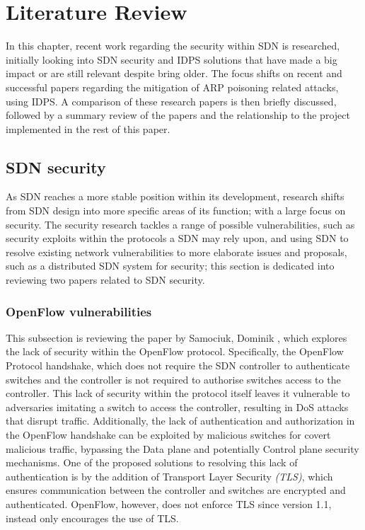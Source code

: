 \documentclass[12pt, oneside]{book}
\begin{document}
\chapter{Literature Review}
In this chapter, recent work regarding the security within SDN is researched,
initially looking into SDN security and IDPS solutions that have made a big impact or are still relevant despite bring older.
The focus shifts on recent and successful papers regarding the mitigation of ARP poisoning related attacks, using IDPS.
A comparison of these research papers is then briefly discussed, followed by a summary review of the papers and
the relationship to the project implemented in the rest of this paper.

\section{SDN security}
\label{sec:SDNSEC}
As SDN reaches a more stable position within its development,
research shifts from SDN design into more specific areas of its function; with a large focus on security.
The security research tackles a range of possible vulnerabilities, such as security exploits within the protocols a SDN may rely upon,
and using SDN to resolve existing network vulnerabilities to more elaborate issues and proposals, such as a distributed SDN system for
security; this section is dedicated into reviewing two papers related to SDN security.

\subsection{OpenFlow vulnerabilities}
This subsection is reviewing the paper by Samociuk, Dominik \cite{samociuk2015secure},
which explores the lack of security within the OpenFlow protocol.
Specifically, the OpenFlow Protocol handshake, which does not require the SDN controller to authenticate switches
and the controller is not required to authorise switches access to the controller.
This lack of security within the protocol itself
leaves it vulnerable to adversaries imitating a switch to access the controller, resulting in
DoS attacks that disrupt traffic.
Additionally, the lack of authentication and authorization in the OpenFlow handshake can be exploited by malicious switches
for covert malicious traffic, bypassing the Data plane and potentially Control plane security mechanisms.
One of the proposed solutions to resolving this lack of authentication is by the addition of Transport Layer Security \emph{(TLS)},
which ensures communication between the controller and switches are encrypted and authenticated.
OpenFlow, however, does not 
enforce TLS since version 1.1, instead only encourages the use of TLS.
\end{document}
